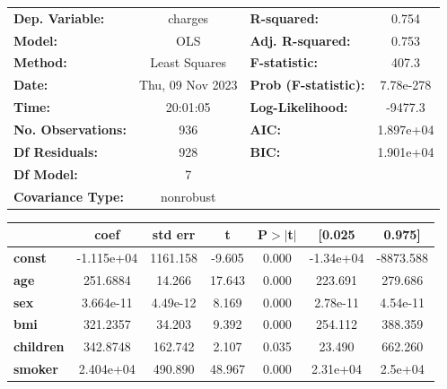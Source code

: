 \begin{center}
\begin{tabular}{lclc}
\toprule
\textbf{Dep. Variable:}    &     charges      & \textbf{  R-squared:         } &     0.754   \\
\textbf{Model:}            &       OLS        & \textbf{  Adj. R-squared:    } &     0.753   \\
\textbf{Method:}           &  Least Squares   & \textbf{  F-statistic:       } &     407.3   \\
\textbf{Date:}             & Thu, 09 Nov 2023 & \textbf{  Prob (F-statistic):} & 7.78e-278   \\
\textbf{Time:}             &     20:01:05     & \textbf{  Log-Likelihood:    } &   -9477.3   \\
\textbf{No. Observations:} &         936      & \textbf{  AIC:               } & 1.897e+04   \\
\textbf{Df Residuals:}     &         928      & \textbf{  BIC:               } & 1.901e+04   \\
\textbf{Df Model:}         &           7      & \textbf{                     } &             \\
\textbf{Covariance Type:}  &    nonrobust     & \textbf{                     } &             \\
\bottomrule
\end{tabular}
\begin{tabular}{lcccccc}
                           & \textbf{coef} & \textbf{std err} & \textbf{t} & \textbf{P$> |$t$|$} & \textbf{[0.025} & \textbf{0.975]}  \\
\midrule
\textbf{const}             &   -1.115e+04  &     1161.158     &    -9.605  &         0.000        &    -1.34e+04    &    -8873.588     \\
\textbf{age}               &     251.6884  &       14.266     &    17.643  &         0.000        &      223.691    &      279.686     \\
\textbf{sex}               &    3.664e-11  &     4.49e-12     &     8.169  &         0.000        &     2.78e-11    &     4.54e-11     \\
\textbf{bmi}               &     321.2357  &       34.203     &     9.392  &         0.000        &      254.112    &      388.359     \\
\textbf{children}          &     342.8748  &      162.742     &     2.107  &         0.035        &       23.490    &      662.260     \\
\textbf{smoker}            &    2.404e+04  &      490.890     &    48.967  &         0.000        &     2.31e+04    &      2.5e+04     \\

\end{tabular}
\end{center}
